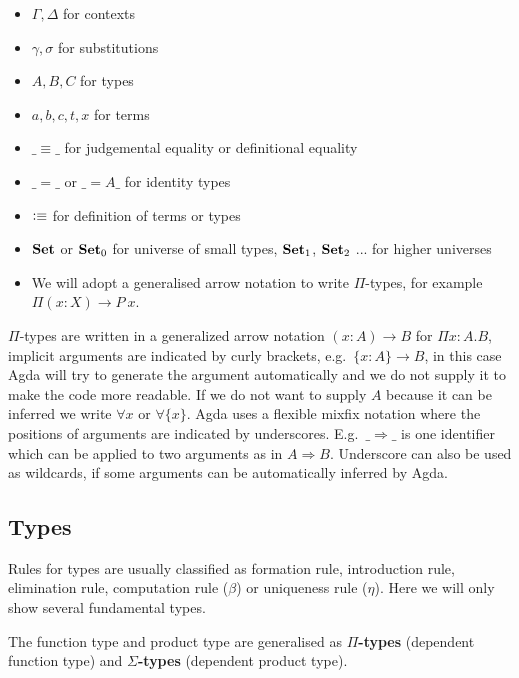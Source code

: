 \begin{itemize}
\item $\Gamma, \Delta$ for contexts

\item $\gamma, \sigma$ for substitutions

\item $A, B, C$ for types

\item $a, b, c, t, x$ for terms

\item $\_\equiv\_$ for judgemental equality or definitional equality

\item $\_=\_$ or $\_={A}\_$ for identity types

\item $\vcentcolon\equiv$ for definition of terms or types

\item $\operatorname{\mathbf{Set}}$ or $\operatorname{\mathbf{Set}}_0$ for universe of small types, $\operatorname{\mathbf{Set}}_1$, $\operatorname{\mathbf{Set}}_2$ ... for higher universes

\item We will adopt a generalised arrow notation to write $\Pi$-types, for example \\ $\Pi (x : X) \to P ~x$.
\end{itemize}


$\Pi$-types are written in a generalized
arrow notation $(x : A) → B$ for $\Pi x:A.B$, implicit arguments are
indicated by curly brackets, e.g.\ $\{x : A\} → B$, in this case Agda
will try to generate the argument automatically and we do not supply it
to make the code more readable. If we do not want to supply $A$ because
it can be inferred we write $\forall x$ or $\forall\{x\}$.
Agda uses a flexible mixfix notation
where the positions of arguments are indicated by underscores.
E.g.\ $\_⇒\_$ is one identifier which can be applied to two arguments as
in $A ⇒ B$. Underscore can also be used as wildcards, if some arguments can be automatically inferred by Agda.


\subsection{Types}

Rules for types are usually classified as formation rule, introduction rule, elimination rule, computation rule ($\beta$) or uniqueness rule ($\eta$). Here we will only show several fundamental types.

The function type and product type are generalised as \textbf{$\Pi$-types} (dependent function type) and \textbf{$\Sigma$-types} (dependent product type).


